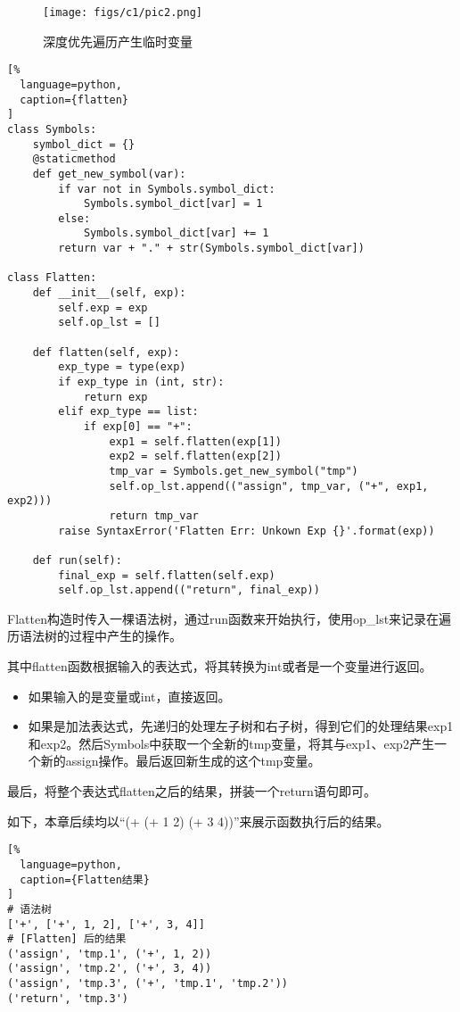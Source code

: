 \begin{figure}[ht]
\centering
\texttt{[image: figs/c1/pic2.png]}
\caption{深度优先遍历产生临时变量}
\label{fig:fig2}
\end{figure}


\begin{lstlisting}[%
  language=python,
  caption={flatten}
]
class Symbols:
    symbol_dict = {}
    @staticmethod
    def get_new_symbol(var):
        if var not in Symbols.symbol_dict:
            Symbols.symbol_dict[var] = 1
        else:
            Symbols.symbol_dict[var] += 1
        return var + "." + str(Symbols.symbol_dict[var])

class Flatten:
    def __init__(self, exp):
        self.exp = exp
        self.op_lst = []
    
    def flatten(self, exp):
        exp_type = type(exp)
        if exp_type in (int, str):
            return exp
        elif exp_type == list:
            if exp[0] == "+":
                exp1 = self.flatten(exp[1])
                exp2 = self.flatten(exp[2])
                tmp_var = Symbols.get_new_symbol("tmp")
                self.op_lst.append(("assign", tmp_var, ("+", exp1, exp2)))
                return tmp_var
        raise SyntaxError('Flatten Err: Unkown Exp {}'.format(exp))

    def run(self):
        final_exp = self.flatten(self.exp)
        self.op_lst.append(("return", final_exp))
\end{lstlisting}

Flatten构造时传入一棵语法树，通过run函数来开始执行，使用op\_lst来记录在遍历语法树的过程中产生的操作。

其中flatten函数根据输入的表达式，将其转换为int或者是一个变量进行返回。
\begin{itemize}
  \item 如果输入的是变量或int，直接返回。
  \item 如果是加法表达式，先递归的处理左子树和右子树，得到它们的处理结果exp1和exp2。然后Symbols中获取一个全新的tmp变量，将其与exp1、exp2产生一个新的assign操作。最后返回新生成的这个tmp变量。
\end{itemize}

最后，将整个表达式flatten之后的结果，拼装一个return语句即可。

如下，本章后续均以“(+ (+ 1 2) (+ 3 4))”来展示函数执行后的结果。

\begin{lstlisting}[%
  language=python,
  caption={Flatten结果}
]
# 语法树
['+', ['+', 1, 2], ['+', 3, 4]]
# [Flatten] 后的结果
('assign', 'tmp.1', ('+', 1, 2))
('assign', 'tmp.2', ('+', 3, 4))
('assign', 'tmp.3', ('+', 'tmp.1', 'tmp.2'))
('return', 'tmp.3')
\end{lstlisting}

